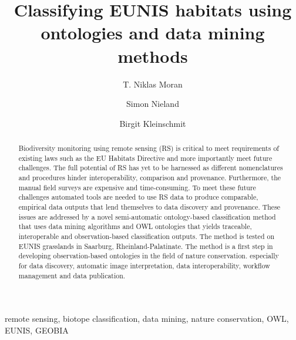 \documentclass[authoryear,final,12pt,number]{elsarticle}
\begin{document}
%
\begin{frontmatter}
\title{Classifying EUNIS habitats using ontologies and data mining 
methods}

\author[TUB]{T. Niklas Moran}

\author[TUB]{Simon Nieland}
\author[TUB]{Birgit Kleinschmit}

\address[TUB]{Geoinformation in Environmental Planning Lab, Technische
Universit\"at Berlin, Stra\ss e des 17. Juni 145, 10623 Berlin, Germany}


\begin{abstract}
Biodiversity monitoring using remote sensing (RS) is critical to meet 
requirements of existing laws such as the EU Habitats Directive and more 
importantly meet future challenges. The full potential of RS has yet to be 
harnessed as different nomenclatures and procedures hinder interoperability, 
comparison and provenance. Furthermore, the manual field surveys are expensive 
and time-consuming. To meet these future challenges automated tools are needed 
to use RS data to produce comparable, empirical data outputs that lend 
themselves to data discovery and provenance. These issues are addressed by a 
novel semi-automatic ontology-based classification method that uses data mining 
algorithms and OWL ontologies that yields traceable, interoperable and 
observation-based classification outputs. The method is tested on EUNIS 
grasslands in Saarburg, Rheinland-Palatinate. The method is a first step in 
developing observation-based ontologies in the field of nature conservation. 
especially for data discovery, automatic image interpretation, data 
interoperability, workflow management and data publication.
\end{abstract}

\begin{keyword}
remote sensing, biotope classification, data mining, nature conservation, OWL, 
EUNIS, GEOBIA 
\end{keyword}
\end{frontmatter}
\end{document}
